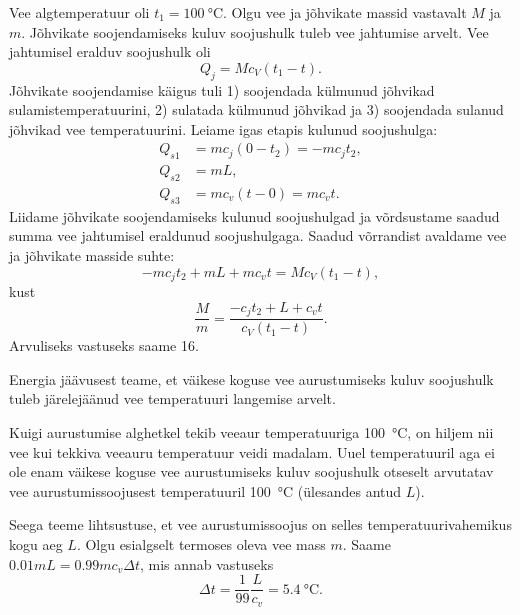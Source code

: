 \documentclass[10pt]{article}
\begin{document}
{
\solu
Vee algtemperatuur oli $t_1=\SI{100}{\degreeCelsius}$. Olgu vee ja jõhvikate massid vastavalt $M$ ja $m$. Jõhvikate soojendamiseks kuluv soojushulk tuleb vee jahtumise arvelt. Vee jahtumisel eralduv soojushulk oli
\[
Q_j=Mc_V(t_1-t).
\]
Jõhvikate soojendamise käigus tuli 1) soojendada külmunud jõhvikad sulamistemperatuurini, 2) sulatada külmunud jõhvikad ja 3) soojendada sulanud jõhvikad vee temperatuurini.
Leiame igas etapis kulunud soojushulga:
\[
\begin{aligned}
Q_{s1}&=mc_j(0-t_2)=-mc_jt_2,\\
Q_{s2}&=mL,\\
Q_{s3}&=mc_v(t-0)=mc_vt.
\end{aligned}
\]
Liidame jõhvikate soojendamiseks kulunud soojushulgad ja võrdsustame saadud summa vee jahtumisel eraldunud soojushulgaga. Saadud võrrandist avaldame vee ja jõhvikate masside suhte:
\[
-mc_jt_2+mL+mc_vt=Mc_V(t_1-t),
\]
kust
\[
\frac{M}{m}=\frac{-c_jt_2+L+c_vt}{c_V(t_1-t)}.
\]
Arvuliseks vastuseks saame \num{16}.
\probend
\bigskip


\solu
Energia jäävusest teame, et väikese koguse vee aurustumiseks kuluv soojushulk tuleb järelejäänud vee temperatuuri langemise arvelt.

Kuigi aurustumise alghetkel tekib veeaur temperatuuriga \SI{100}{\degreeCelsius}, on hiljem nii vee
kui tekkiva veeauru temperatuur veidi madalam. Uuel temperatuuril aga ei ole enam
väikese koguse vee aurustumiseks kuluv soojushulk otseselt arvutatav vee aurustumissoojusest temperatuuril \SI{100}{\degreeCelsius} (ülesandes antud $L$).

Seega teeme lihtsustuse, et vee aurustumissoojus on selles temperatuurivahemikus kogu aeg $L$. Olgu esialgselt termoses oleva vee mass $m$. Saame $\num{0,01}mL = \num{0,99}mc_v\Delta t$, mis annab vastuseks
\[
\Delta t=\frac{1}{99} \frac{L}{c_{v}}=\SI{5,4}{\degreeCelsius}.
\]
\probend
\bigskip


}
\end{document}
